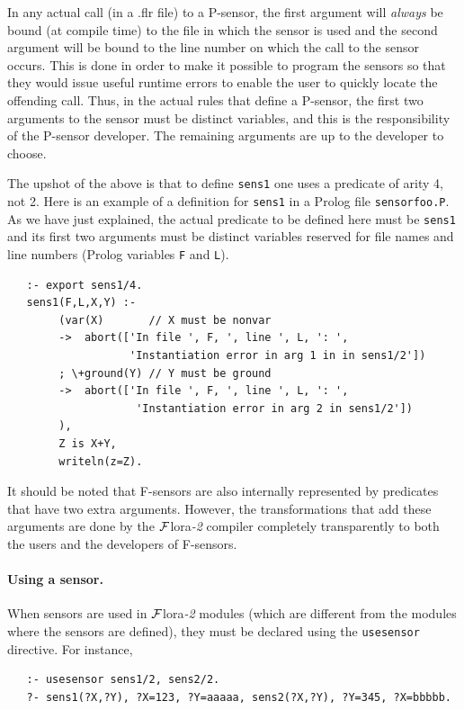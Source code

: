 \documentclass[11pt]{article}
\newcommand{\FLORA}{{\mbox{\sc ${\cal F}${lora}\rm\emph{-2}}}\xspace}
\begin{document}
In any actual call (in a .flr file) to a P-sensor, the first argument will
\emph{always} be bound (at compile time) to the
file in which the sensor is used and the second 
argument will be bound to the line number
on which the call to the sensor occurs.
This is done in order to make it possible to program the sensors so that they
would issue useful runtime errors to
enable the user to quickly locate the offending call. 
Thus, in the actual rules that define a P-sensor,
the first two arguments to the sensor must be distinct variables, and this
is the responsibility of the P-sensor developer.
The remaining arguments are up to the developer to choose.

The upshot of the above is that
to define \texttt{sens1} one uses
a predicate of arity 4, not 2.  
Here is an example of a definition for \texttt{sens1} in a Prolog file
\texttt{sensorfoo.P}. As we have just
explained, the actual predicate to be defined here must be \texttt{sens1}
and its first two arguments must be distinct variables 
reserved for file names and line numbers
(Prolog variables \texttt{F} and \texttt{L}).  
\begin{verbatim}
   :- export sens1/4.
   sens1(F,L,X,Y) :-
        (var(X)       // X must be nonvar
        ->  abort(['In file ', F, ', line ', L, ': ',
                   'Instantiation error in arg 1 in in sens1/2'])
        ; \+ground(Y) // Y must be ground
        ->  abort(['In file ', F, ', line ', L, ': ',
                    'Instantiation error in arg 2 in sens1/2'])
        ),
        Z is X+Y,
        writeln(z=Z).
\end{verbatim}

It should be noted that F-sensors are also internally represented by
predicates that have two extra arguments. However, the transformations that
add these arguments are done by the \FLORA compiler completely
transparently to both the users and the developers of F-sensors.

\paragraph{Using a sensor.}
When sensors are
used in \FLORA modules (which are different from the modules where the
sensors are defined), they must be declared using the
\texttt{usesensor} directive.  For instance,
\begin{verbatim}
   :- usesensor sens1/2, sens2/2.
   ?- sens1(?X,?Y), ?X=123, ?Y=aaaaa, sens2(?X,?Y), ?Y=345, ?X=bbbbb.
\end{verbatim}
\end{document}
